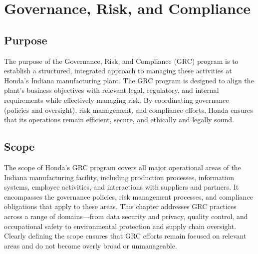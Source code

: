 \chapter{Governance, Risk, and Compliance}
\pagestyle{fancy}

\fancyhf{}

\fancyfoot[C]{\thepage}

\renewcommand{\headrulewidth}{0pt}
\renewcommand{\footrulewidth}{0pt}



\section{Purpose}
The purpose of the Governance, Risk, and Compliance (GRC) program is to establish a structured, integrated approach to managing these activities at Honda's Indiana manufacturing plant. The GRC program is designed to align the plant’s business objectives with relevant legal, regulatory, and internal requirements while effectively managing risk. By coordinating governance (policies and oversight), risk management, and compliance efforts, Honda ensures that its operations remain efficient, secure, and ethically and legally sound.

\section{Scope}
The scope of Honda's GRC program covers all major operational areas of the Indiana manufacturing facility, including production processes, information systems, employee activities, and interactions with suppliers and partners. It encompasses the governance policies, risk management processes, and compliance obligations that apply to these areas. This chapter addresses GRC practices across a range of domains---from data security and privacy, quality control, and occupational safety to environmental protection and supply chain oversight. Clearly defining the scope ensures that GRC efforts remain focused on relevant areas and do not become overly broad or unmanageable.

